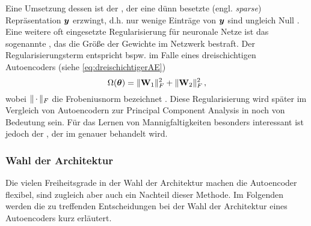 Eine Umsetzung dessen ist der , der eine dünn besetzte (engl.
\textit{sparse}) Repräsentation $\bm{y}$ erzwingt, d.h. nur wenige Einträge von $\bm{y}$ sind
ungleich Null \parencite[505]{Goodfellow.2016}. Eine weitere oft eingesetzte Regularisierung für neuronale Netze ist
das sogenannte , das die Größe der Gewichte im Netzwerk bestraft. Der
Regularisierungsterm entspricht bspw. im Falle eines dreischichtigen Autoencoders (siehe
\eqref{eq:dreischichtigerAE})
\begin{equation}
	\label{eq:WeightDecay}
	\Omega(\bm{\theta}) = \lVert\mathbf{W}_1\rVert^2_F + \lVert\mathbf{W}_2\rVert^2_F \, ,
\end{equation}
wobei $\lVert\,\cdot\,\rVert_F$ die Frobeniusnorm bezeichnet \parencite[1]{Kunin.2019}. Diese Regularisierung wird später im Vergleich von Autoencodern zur
Principal Component Analysis in  noch von Bedeutung sein.
Für das Lernen von Mannigfaltigkeiten besonders interessant ist jedoch der  \parencite{Rifai.2011a}, der im  genauer behandelt wird.

\subsubsection{Wahl der Architektur}
\label{ch:MethodenDerDimRed:ML:AE:WahlArchitektur}

Die vielen Freiheitsgrade in der Wahl der Architektur machen die Autoencoder flexibel, sind
zugleich aber auch ein Nachteil dieser Methode. Im Folgenden werden die zu treffenden
Entscheidungen bei der Wahl der Architektur eines Autoencoders kurz erläutert.

